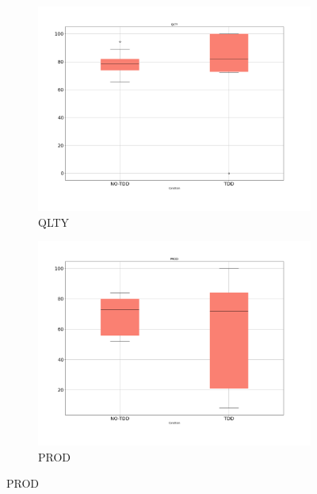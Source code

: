 \begin{figure}[H]
    \centering
    \begin{subfigure}{0.5\textwidth}
        \includegraphics[width=\linewidth]{figures/box_plots/task1_2/QLTY.png}
        \caption{QLTY}
        \label{bp_task2_qlty}
    \end{subfigure}\hfil
    \begin{subfigure}{0.5\textwidth}
        \includegraphics[width=\linewidth]{figures/box_plots/task1_2/PROD.png}
        \caption{PROD}
        \label{bp_task2_prod}
    \end{subfigure}

    \medskip


\end{figure}
